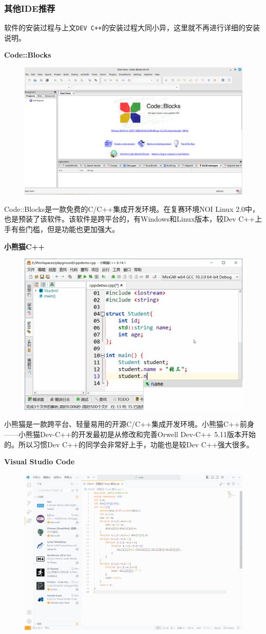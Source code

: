 \subsubsection{其他IDE推荐}
软件的安装过程与上文\texttt{DEV C++}的安装过程大同小异，这里就不再进行详细的安装说明。

\noindent\textbf{Code::Blocks}
\begin{figure}[H]
\centering
\includegraphics[width=0.6\linewidth]{01chapter/img/codeblocks}
\caption{}
\label{fig:codeblocks}
\end{figure}


Code::Blocks是一款免费的C/C++集成开发环境。在复赛环境NOI Linux 2.0中，也是预装了该软件。该软件是跨平台的，有Windows和Linux版本，较Dev C++上手有些门槛，但是功能也更加强大。

\noindent\textbf{小熊猫C++}

\begin{figure}[H]
\centering
\includegraphics[width=0.6\linewidth]{01chapter/img/codeintellisense}
\caption{}
\label{fig:codeintellisense}
\end{figure}


小熊猫是一款跨平台、轻量易用的开源C/C++集成开发环境。小熊猫C++前身——小熊猫Dev-C++的开发最初是从修改和完善Orwell Dev-C++ 5.11版本开始的。所以习惯Dev C++的同学会非常好上手，功能也是较Dev C++强大很多。

\noindent\textbf{Visual Studio Code}
\begin{figure}[H]
	\centering
	\includegraphics[width=0.7\linewidth]{01chapter/img/vscode}
	\caption{}
	\label{fig:vscode}
\end{figure}

